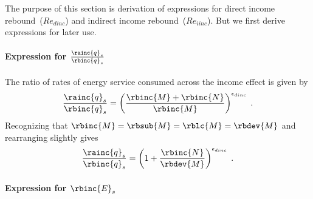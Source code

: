 The purpose of this section is derivation of expressions for 
direct income rebound~($Re_{dinc}$) and indirect income rebound~($Re_{iinc}$).
But we first derive expressions for later use.


\paragraph{Expression for $\frac{\rainc{q}_s}{\rbinc{q}_s}$}
\label{sec:qs_ratio}

The ratio of rates of energy service consumed across the income effect is given by
%
\begin{equation}
  \frac{\rainc{q}_s}{\rbinc{q}_s} = \left( \frac{\rbinc{M} + \rbinc{N}}{\rbinc{M}} \right) ^ {\epsilon_{dinc}} \; .
\end{equation}
%
Recognizing that $\rbinc{M} = \rbsub{M} = \rblc{M} = \rbdev{M}$ and rearranging slightly gives
%
\begin{equation} \label{eq:q_ratio_across_inc}
  \frac{\rainc{q}_s}{\rbinc{q}_s} = \left( 1 + \frac{\rbinc{N}}{\rbdev{M}} \right) ^ {\epsilon_{dinc}} \; .
\end{equation}


\paragraph{Expression for $\rbinc{E}_s$} 
\label{sec:E_dot_s_hat_expression}

